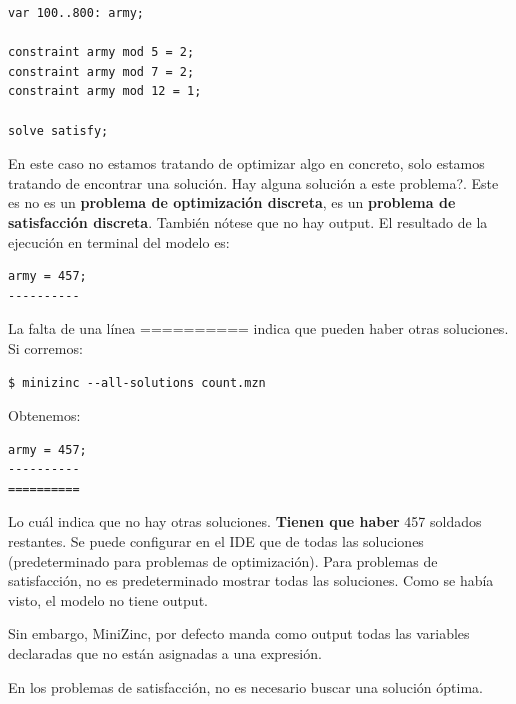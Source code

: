 \documentclass[12pt]{article}
\begin{document}
\begin{Verbatim}
var 100..800: army;

constraint army mod 5 = 2;
constraint army mod 7 = 2;
constraint army mod 12 = 1;

solve satisfy;
\end{Verbatim}

\begin{justify}
En este caso no estamos tratando de optimizar algo en concreto, solo estamos tratando de encontrar una solución. Hay alguna solución a este problema?. Este es no es un \textbf{problema de optimización discreta}, es un \textbf{problema de satisfacción discreta}. También nótese que no hay output. El resultado de la ejecución en terminal del modelo es:
\end{justify}

\begin{Verbatim}
army = 457;
----------
\end{Verbatim}

\begin{justify}
La falta de una línea ========== indica que pueden haber otras soluciones. Si corremos:
\end{justify}

\begin{Verbatim}
$ minizinc --all-solutions count.mzn
\end{Verbatim}

\begin{justify}
Obtenemos:
\end{justify}

\begin{Verbatim}
army = 457;
----------
==========
\end{Verbatim}

\begin{justify}
Lo cuál indica que no hay otras soluciones. \textbf{Tienen que haber} 457 soldados restantes. Se puede configurar en el IDE que de todas las soluciones (predeterminado para problemas de optimización). Para problemas de satisfacción, no es predeterminado mostrar todas las soluciones. Como se había visto, el modelo no tiene output.
\end{justify}

\begin{justify}
Sin embargo, MiniZinc, por defecto manda como output todas las variables declaradas que no están asignadas a una expresión.
\end{justify}

\begin{justify}
En los problemas de satisfacción, no es necesario buscar una solución óptima. 
\end{justify}
\end{document}
